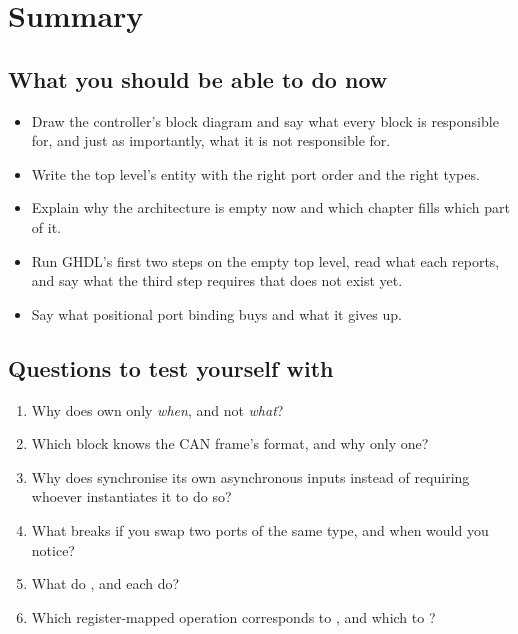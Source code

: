 
\section{Summary}
\label{c11:sec:review}

\subsection*{What you should be able to do now}
\begin{itemize}
  \item Draw the controller's block diagram and say what every block is responsible for, and just as
    importantly, what it is not responsible for.
  \item Write the top level's entity with the right port order and the right types.
  \item Explain why the architecture is empty now and which chapter fills which part of it.
  \item Run GHDL's first two steps on the empty top level, read what each reports, and say what the
    third step requires that does not exist yet.
  \item Say what positional port binding buys and what it gives up.
\end{itemize}

\subsection*{Questions to test yourself with}
\begin{enumerate}
  \item Why does  own only \emph{when}, and not \emph{what}?
  \item Which block knows the CAN frame's format, and why only one?
  \item Why does  synchronise its own asynchronous inputs instead of requiring
    whoever instantiates it to do so?
  \item What breaks if you swap two ports of the same type, and when would you notice?
  \item What do ,  and  each do?
  \item Which register-mapped operation corresponds to , and which to ?
\end{enumerate}

